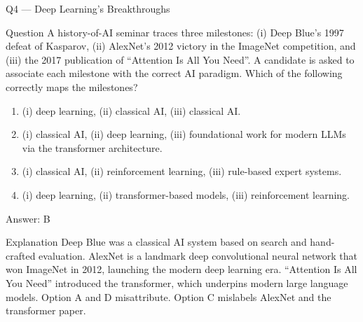 \documentclass[aspectratio=169,8pt]{beamer}
\begin{document}
	\begin{frame}{Q4 --- Deep Learning's Breakthroughs}
		\begin{block}{Question}
			A history-of-AI seminar traces three milestones: (i) Deep Blue's 1997 defeat of Kasparov, (ii) AlexNet's 2012 victory in the ImageNet competition, and (iii) the 2017 publication of ``Attention Is All You Need''. A candidate is asked to associate each milestone with the correct AI paradigm. Which of the following correctly maps the milestones?
		\end{block}
		\begin{enumerate}
			\item (i) deep learning, (ii) classical AI, (iii) classical AI.
			\item (i) classical AI, (ii) deep learning, (iii) foundational work for modern LLMs via the transformer architecture.
			\item (i) classical AI, (ii) reinforcement learning, (iii) rule-based expert systems.
			\item (i) deep learning, (ii) transformer-based models, (iii) reinforcement learning.
		\end{enumerate}
		\begin{exampleblock}{Answer: B}\end{exampleblock}
		\begin{block}{Explanation}
			Deep Blue was a classical AI system based on search and hand-crafted evaluation. AlexNet is a landmark deep convolutional neural network that won ImageNet in 2012, launching the modern deep learning era. ``Attention Is All You Need'' introduced the transformer, which underpins modern large language models. Option A and D misattribute. Option C mislabels AlexNet and the transformer paper.
		\end{block}
	\end{frame}
	
\end{document}
